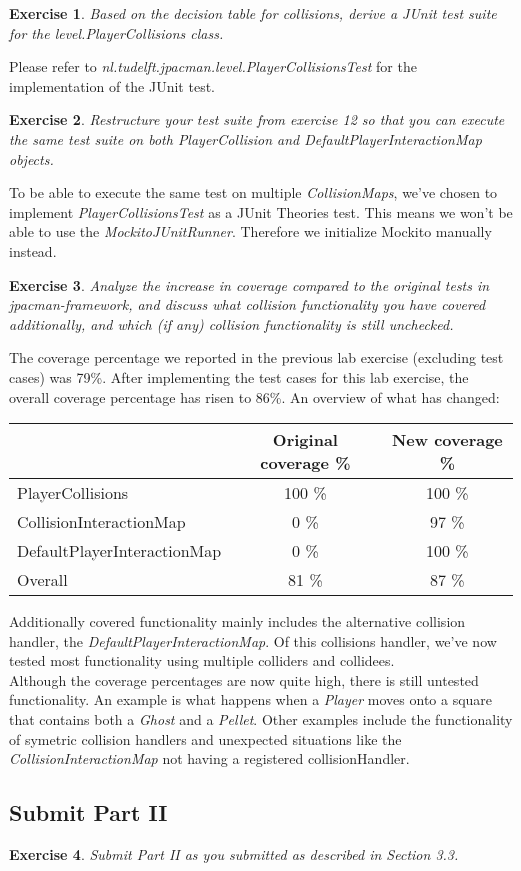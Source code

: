 \documentclass[a4paper]{article}
\newtheorem{thm}{Exercise}
\begin{document}
    \begin{thm}
      Based on the decision table for collisions, derive a JUnit test suite for the
      level.PlayerCollisions class.
    \end{thm}
    Please refer to \textit{nl.tudelft.jpacman.level.PlayerCollisionsTest} for the implementation of the JUnit test.

    \begin{thm}
      Restructure your test suite from exercise 12 so that you can execute the same test
      suite on both PlayerCollision and DefaultPlayerInteractionMap objects.
    \end{thm}
    To be able to execute the same test on multiple \textit{CollisionMaps}, we've chosen to implement \textit{PlayerCollisionsTest} as a JUnit Theories test.
    This means we won't be able to use the \textit{MockitoJUnitRunner}. Therefore we initialize Mockito manually instead.
    
    \newpage
    \begin{thm}
      Analyze the increase in coverage compared to the original tests in jpacman-framework,
      and discuss what collision functionality you have covered additionally,
      and which (if any) collision functionality is still unchecked.
    \end{thm}
    The coverage percentage we reported in the previous lab exercise (excluding test cases) was 79\%.
    After implementing the test cases for this lab exercise, the overall coverage percentage has risen to 86\%.
    An overview of what has changed:
    \begin{table}[h]
      \begin{tabular}{|l|c|c|}
        \cline{2-3}
        \multicolumn{1}{l|}{}		& Original coverage \%	& New coverage \%	\\ \hline
        PlayerCollisions		& 100 \%		& 100 \%		\\ \hline
        CollisionInteractionMap		& 0 \%			& 97 \%			\\ \hline
        DefaultPlayerInteractionMap	& 0 \%			& 100 \%		\\ \hline
        Overall				& 81 \%			& 87 \%			\\ \hline
      \end{tabular}
    \end{table}
    Additionally covered functionality mainly includes the alternative collision handler, the \textit{DefaultPlayerInteractionMap}.
    Of this collisions handler, we've now tested most functionality using multiple colliders and collidees. \\
    Although the coverage percentages are now quite high, there is still untested functionality.
    An example is what happens when a \textit{Player} moves onto a square that contains both a \textit{Ghost} and a \textit{Pellet}.
    Other examples include the functionality of symetric collision handlers and unexpected situations
    like the \textit{CollisionInteractionMap} not having a registered collisionHandler.
  
  \subsection{Submit Part II}
    \begin{thm}
      Submit Part II as you submitted as described in Section 3.3.
    \end{thm}
\end{document}
